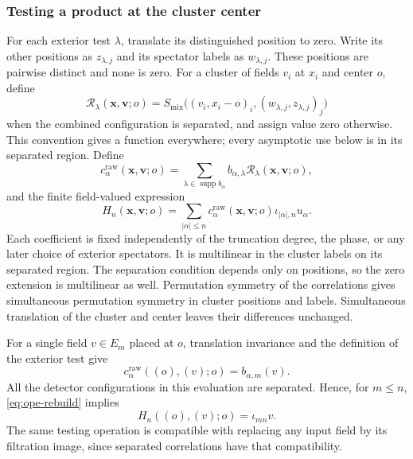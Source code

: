 \subsubsection{Testing a product at the cluster center}
For each exterior test $\lambda$, translate its distinguished position to
zero. Write its other positions as $z_{\lambda,j}$ and its spectator
labels as $w_{\lambda,j}$. These positions are pairwise distinct and none
is zero. For a cluster of fields $v_i$ at $x_i$ and center $o$, define
\[
 \mathcal R_\lambda(\boldsymbol x,\boldsymbol v;o)
 =S_{\mathrm{mix}}\bigl((v_i,x_i-o)_i,
                         (w_{\lambda,j},z_{\lambda,j})_j\bigr)
\]
when the combined configuration is separated, and assign value zero
otherwise. This convention gives a function everywhere; every asymptotic
use below is in its separated region. Define
\begin{equation}\label{eq:ope-raw-coefficient}
 c_\alpha^{\mathrm{raw}}(\boldsymbol x,\boldsymbol v;o)
       =\sum_{\lambda\in\operatorname{supp}b_\alpha}
                  b_{\alpha,\lambda}
                  \mathcal R_\lambda(\boldsymbol x,\boldsymbol v;o),
\end{equation}
and the finite field-valued expression
\begin{equation}\label{eq:ope-raw-shadow}
 H_n(\boldsymbol x,\boldsymbol v;o)
   =\sum_{|\alpha|\leq n}
       c_\alpha^{\mathrm{raw}}(\boldsymbol x,\boldsymbol v;o)
                                      \iota_{|\alpha|,n}u_\alpha.
\end{equation}
Each coefficient is fixed independently of the truncation degree, the
phase, or any later choice of exterior spectators. It is multilinear in
the cluster labels on its separated region. The separation condition
depends only on positions, so the zero extension is multilinear as well.
Permutation symmetry of the correlations gives simultaneous permutation
symmetry in cluster positions and labels. Simultaneous translation of the
cluster and center leaves their differences unchanged.

For a single field $v\in E_m$ placed at $o$, translation invariance and
the definition of the exterior test give
\[
 c_\alpha^{\mathrm{raw}}((o),(v);o)=b_{\alpha,m}(v).
\]
All the detector configurations in this evaluation are separated. Hence,
for $m\leq n$, \eqref{eq:ope-rebuild} implies
\begin{equation}\label{eq:ope-raw-single}
 H_n((o),(v);o)=\iota_{mn}v.
\end{equation}
The same testing operation is compatible with replacing any input field
by its filtration image, since separated correlations have that
compatibility.

